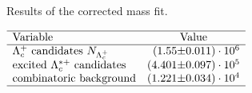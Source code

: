  
\begin{table}[h]
    \centering
    \caption{Results of the \Lc corrected mass fit.}
    \label{tab:fit_correctedMass}
    $\begin{array}{lr@{\pm}l}
    \hline
    \text{Variable} & \multicolumn{2}{c}{\text{Value}} \\
    \hline
        \text{\Lc candidates \NLc}&(1.55 & 0.011) \cdot 10^{6}\\
\text{excited \Lcstar candidates}&(4.401 & 0.097) \cdot 10^{5}\\
\text{combinatoric background}&(1.221 & 0.034) \cdot 10^{4}\\

\hline
\end{array}$
\end{table}
    